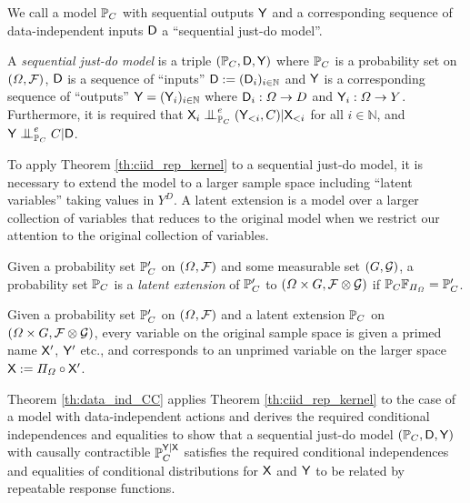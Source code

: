 We call a model $\mathbb{P}_C$ with sequential outputs $\mathsf{Y}$ and a corresponding sequence of data-independent inputs $\mathsf{D}$ a ``sequential just-do model''.

\begin{definition}
A \emph{sequential just-do model} is a triple $(\mathbb{P}_C,\mathsf{D},\mathsf{Y})$ where $\mathbb{P}_C$ is a probability set on $(\Omega,\mathcal{F})$, $\mathsf{D}$ is a sequence of ``inputs'' $\mathsf{D}:=(\mathsf{D}_i)_{i\in\mathbb{N}}$ and $\mathsf{Y}$ is a corresponding sequence of ``outputs'' $\mathsf{Y}=(\mathsf{Y}_i)_{i\in\mathbb{N}}$ where $\mathsf{D}_i:\Omega\to D$ and $\mathsf{Y}_i:\Omega\to Y$. Furthermore, it is required that $\RV{X}_i\CI^e_{\prob{P}_C} (\RV{Y}_{<i},C)|\RV{X}_{<i}$ for all $i\in \mathbb{N}$, and $\RV{Y}\CI^e_{\prob{P}_C} C|\RV{D}$.
\end{definition}

To apply Theorem \ref{th:ciid_rep_kernel} to a sequential just-do model, it is necessary to extend the model to a larger sample space including ``latent variables'' taking values in $Y^D$. A latent extension is a model over a larger collection of variables that reduces to the original model when we restrict our attention to the original collection of variables.

\begin{definition}
Given a probability set $\mathbb{P}_C'$ on $(\Omega,\mathcal{F})$ and some measurable set $(G,\mathcal{G})$, a probability set $\mathbb{P}_C$ is a \emph{latent extension} of $\mathbb{P}_C'$ to $(\Omega\times G,\mathcal{F}\otimes \mathcal{G})$ if $\mathbb{P}_C \mathbb{F}_{\Pi_{\Omega}} = \mathbb{P}_C'$.
\end{definition}

\begin{notation}
Given a probability set $\mathbb{P}_C'$ on $(\Omega,\mathcal{F})$ and a latent extension $\mathbb{P}_C$ on $(\Omega\times G,\mathcal{F}\otimes \mathcal{G})$, every variable on the original sample space is given a primed name $\mathsf{X}'$, $\mathsf{Y}'$ etc., and corresponds to an unprimed variable on the larger space $\mathsf{X}:=\Pi_\Omega\circ \mathsf{X}'$.
\end{notation}

Theorem \ref{th:data_ind_CC} applies Theorem \ref{th:ciid_rep_kernel} to the case of a model with data-independent actions and derives the required conditional independences and equalities to show that a sequential just-do model $(\mathbb{P}_C,\mathsf{D},\mathsf{Y})$ with causally contractible $\mathbb{P}_C^{\mathsf{Y}|\mathsf{X}}$ satisfies the required conditional independences and equalities of conditional distributions for $\mathsf{X}$ and $\mathsf{Y}$ to be related by repeatable response functions.

